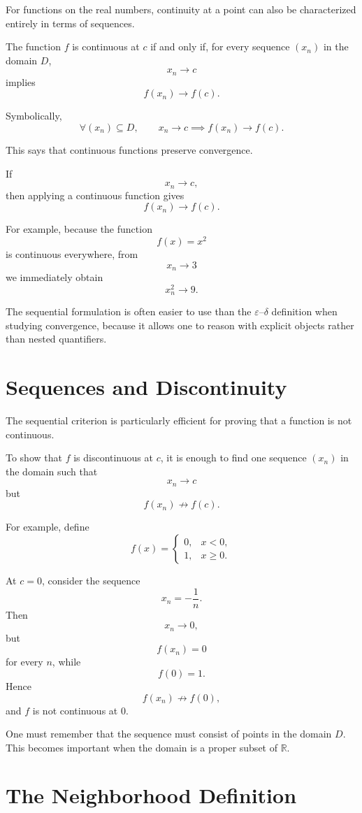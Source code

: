 \documentclass{essay}
\begin{document}
For functions on the real numbers, continuity at a point can also be characterized entirely in terms of sequences.

The function $f$ is continuous at $c$ if and only if, for every sequence $(x_n)$ in the domain $D$,
\[
x_n\to c
\]
implies
\[
f(x_n)\to f(c).
\]

Symbolically,
\[
\boxed{
\forall (x_n)\subseteq D,
\qquad
x_n\to c
\implies
f(x_n)\to f(c).
}
\]

This says that continuous functions preserve convergence.

If
\[
x_n\to c,
\]
then applying a continuous function gives
\[
f(x_n)\to f(c).
\]

For example, because the function
\[
f(x)=x^2
\]
is continuous everywhere, from
\[
x_n\to 3
\]
we immediately obtain
\[
x_n^2\to 9.
\]

The sequential formulation is often easier to use than the $\varepsilon$--$\delta$ definition when studying convergence, because it allows one to reason with explicit objects rather than nested quantifiers.

\section{Sequences and Discontinuity}

The sequential criterion is particularly efficient for proving that a function is not continuous.

To show that $f$ is discontinuous at $c$, it is enough to find one sequence $(x_n)$ in the domain such that
\[
x_n\to c
\]
but
\[
f(x_n)\not\to f(c).
\]

For example, define
\[
f(x)=
\begin{cases}
0, & x<0,\\
1, & x\ge 0.
\end{cases}
\]

At $c=0$, consider the sequence
\[
x_n=-\frac{1}{n}.
\]
Then
\[
x_n\to 0,
\]
but
\[
f(x_n)=0
\]
for every $n$, while
\[
f(0)=1.
\]
Hence
\[
f(x_n)\not\to f(0),
\]
and $f$ is not continuous at $0$.

One must remember that the sequence must consist of points in the domain $D$. This becomes important when the domain is a proper subset of $\mathbb R$.

\section{The Neighborhood Definition}
\end{document}
